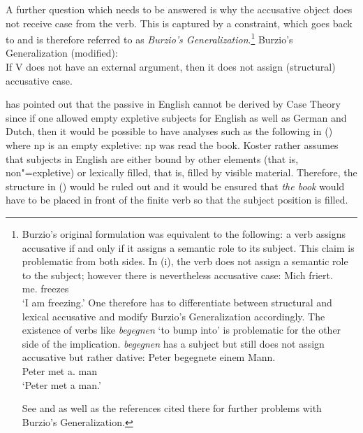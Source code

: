 A further question which needs to be answered is why the accusative object does not receive case from the verb.
This is captured by a constraint, which goes back to \citet[--185]{Burzio86a-u-gekauft} and is therefore
referred to as \emph{Burzio's Generalization}.\footnote{%
Burzio's original formulation was equivalent to the following: a verb assigns accusative if and only if it assigns
a semantic role to its subject.
This claim is problematic from both sides. In (i), the verb does not assign a semantic role to the subject; however
there is nevertheless accusative case:
\ea
\gll Mich friert.\\
	 me.\ACC{} freezes\\
\glt `I am freezing.'
\z
One therefore has to differentiate between structural and lexical accusative and modify Burzio's Generalization
accordingly. The existence of verbs like \emph{begegnen} `to bump into' is problematic for the other side of
the implication. \emph{begegnen} has a subject but still does not assign accusative but rather
dative:
\ea
\gll Peter begegnete einem Mann.\\
     Peter met a.\DAT{} man\\
\glt `Peter met a man.'
\z

See  and  as well as the references cited there for further problems
with Burzio's Generalization.
}
\largerpage
\ea
Burzio's Generalization (modified):\\
If V does not have an external argument, then it does not assign (structural) accusative case.
\z

\noindent
\citet[]{Koster86a} has pointed out that the passive in English cannot be derived by Case
Theory since if one allowed empty expletive subjects for English as well as German and Dutch, then it would be possible
to have analyses such as the following in () where np is an empty expletive:
\ea
np was read the book.
\z
Koster rather assumes that subjects in English are either bound by other elements (that is, non"=expletive) or lexically filled, that
is, filled by visible material.
Therefore, the structure in () would be ruled out and it would be ensured that \emph{the book} would have to be placed in front
of the finite verb so that the subject position is filled.



